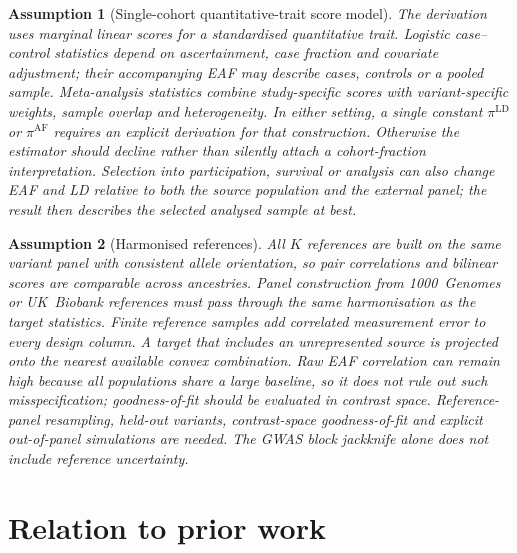 \documentclass[11pt,a4paper]{article}
\newtheorem{assumption}{Assumption}
\begin{document}
\begin{assumption}[Single-cohort quantitative-trait score model]\label{ass:gwas}
The derivation uses marginal linear scores for a standardised quantitative
trait. Logistic case--control statistics depend on ascertainment, case
fraction and covariate adjustment; their accompanying EAF may describe
cases, controls or a pooled sample. Meta-analysis statistics combine
study-specific scores with variant-specific weights, sample overlap and
heterogeneity. In either setting, a single constant
$\pi^{\mathrm{LD}}$ or $\pi^{\mathrm{AF}}$ requires an explicit derivation
for that construction. Otherwise the estimator should decline rather than
silently attach a cohort-fraction interpretation.
Selection into participation, survival or analysis can also change EAF and
LD relative to both the source population and the external panel; the
result then describes the selected analysed sample at best.
\end{assumption}

\begin{assumption}[Harmonised references]\label{ass:refs}
All $K$ references are built on the same variant panel with consistent
allele orientation, so pair correlations and bilinear scores are
comparable across ancestries. Panel construction from 1000~Genomes
\citep{auton20151000g} or UK~Biobank references \citep{prive2020ldpred2}
must pass through the same harmonisation as the target statistics.
Finite reference samples add correlated measurement error to every design
column. A target that includes an unrepresented source is projected onto the
nearest available convex combination. Raw EAF correlation can remain high
because all populations share a large baseline, so it does not rule out such
misspecification; goodness-of-fit should be evaluated in contrast space.
Reference-panel
resampling, held-out variants, contrast-space goodness-of-fit and explicit
out-of-panel simulations are needed. The GWAS block jackknife alone does not
include reference uncertainty.
\end{assumption}

\section{Relation to prior work}\label{sec:prior}
\end{document}
